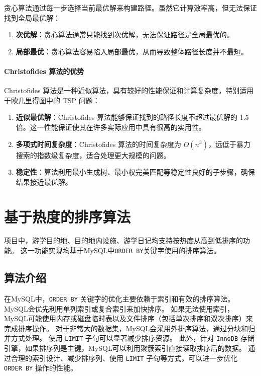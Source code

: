 \documentclass{report}
\begin{document}
贪心算法通过每一步选择当前最优解来构建路径。虽然它计算效率高，但无法保证找到全局最优解：

\begin{enumerate}
    \item \textbf{次优解}：贪心算法通常只能找到次优解，无法保证路径是全局最优的。
    \item \textbf{局部最优}：贪心算法容易陷入局部最优，从而导致整体路径长度并不最短。
\end{enumerate}

\paragraph{Christofides 算法的优势}

Christofides 算法是一种近似算法，具有较好的性能保证和计算复杂度，特别适用于欧几里得图中的 TSP 问题：

\begin{enumerate}
    \item \textbf{近似最优解}：Christofides 算法能够保证找到的路径长度不超过最优解的 1.5 倍。这一性能保证使其在许多实际应用中具有很高的实用性。
    \item \textbf{多项式时间复杂度}：Christofides 算法的时间复杂度为 $O(n^3)$，远低于暴力搜索的指数级复杂度，适合处理更大规模的问题。
    \item \textbf{稳定性}：算法利用最小生成树、最小权完美匹配等稳定性良好的子步骤，确保结果接近最优解。
\end{enumerate}

\section{基于热度的排序算法}
项目中，游学目的地、目的地内设施、游学日记均支持按热度从高到低排序的功能。
这一功能实现均基于MySQL中\verb|ORDER BY|关键字使用的排序算法。
\subsection{算法介绍}
在MySQL中，\verb|ORDER BY| 关键字的优化主要依赖于索引和有效的排序算法。MySQL会优先利用单列索引或复合索引来加快排序。
如果无法使用索引，MySQL可能使用内存或磁盘临时表以及文件排序（包括单次排序和双次排序）来完成排序操作。
对于非常大的数据集，MySQL会采用外排序算法，通过分块和归并方式处理。
使用 \verb|LIMIT| 子句可以显著减少排序资源。
此外，针对 \verb|InnoDB| 存储引擎，如果排序列是主键，MySQL可以利用聚簇索引直接读取排序后的数据。
通过合理的索引设计、减少排序列、使用 \verb|LIMIT| 子句等方式，可以进一步优化 \verb|ORDER BY| 操作的性能。
\end{document}
